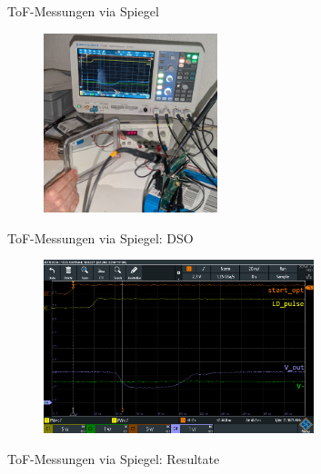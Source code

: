 \begin{frame}{ToF-Messungen via Spiegel}
    \begin{figure}
        \includegraphics[width=0.45\textwidth]{../documentation/graphics/spiegel_setup.jpg}
    \end{figure}

    \iconoptical
\end{frame}

\begin{frame}{ToF-Messungen via Spiegel: DSO}
    \begin{figure}
        \includegraphics[width=0.7\textwidth]{../documentation/graphics/spiegel_12cm_dso_ok.png}
    \end{figure}

    \iconoptical
\end{frame}

\begin{frame}{ToF-Messungen via Spiegel: Resultate}
    \begin{figure}
        
    \end{figure}

    \iconoptical
\end{frame}

